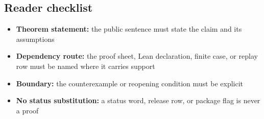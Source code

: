 \subsection{Reader checklist}

\begin{itemize}[leftmargin=1.8em]

\item \textbf{Theorem statement:} the public sentence must state the claim and its assumptions

\item \textbf{Dependency route:} the proof sheet, Lean declaration, finite case, or replay row must be named where it carries support

\item \textbf{Boundary:} the counterexample or reopening condition must be explicit

\item \textbf{No status substitution:} a status word, release row, or package flag is never a proof

\end{itemize}
